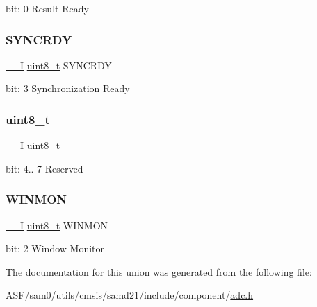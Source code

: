 bit\+: 0 Result Ready \mbox{\label{union_a_d_c___i_n_t_f_l_a_g___type_ae8a10cfa0bb63130ae1e8150943d680b}} 
\subsubsection{\texorpdfstring{SYNCRDY}{SYNCRDY}}
{\footnotesize\ttfamily \mbox{\hyperlink{core__cm0plus_8h_af63697ed9952cc71e1225efe205f6cd3}{\+\_\+\+\_\+I}} \mbox{\hyperlink{union_a_d_c___i_n_t_f_l_a_g___type_a5b4208c6f4c4a4290c4f2804d1eb1d5b}{uint8\+\_\+t}} S\+Y\+N\+C\+R\+DY}

bit\+: 3 Synchronization Ready \mbox{\label{union_a_d_c___i_n_t_f_l_a_g___type_a5b4208c6f4c4a4290c4f2804d1eb1d5b}} 
\subsubsection{\texorpdfstring{uint8\_t}{uint8\_t}}
{\footnotesize\ttfamily \mbox{\hyperlink{core__cm0plus_8h_af63697ed9952cc71e1225efe205f6cd3}{\+\_\+\+\_\+I}} uint8\+\_\+t}

bit\+: 4.. 7 Reserved \mbox{\label{union_a_d_c___i_n_t_f_l_a_g___type_abb342555b4de142cf8d3064427f4a1a9}} 
\subsubsection{\texorpdfstring{WINMON}{WINMON}}
{\footnotesize\ttfamily \mbox{\hyperlink{core__cm0plus_8h_af63697ed9952cc71e1225efe205f6cd3}{\+\_\+\+\_\+I}} \mbox{\hyperlink{union_a_d_c___i_n_t_f_l_a_g___type_a5b4208c6f4c4a4290c4f2804d1eb1d5b}{uint8\+\_\+t}} W\+I\+N\+M\+ON}

bit\+: 2 Window Monitor 

The documentation for this union was generated from the following file\+:\begin{DoxyCompactItemize}
\item 
A\+S\+F/sam0/utils/cmsis/samd21/include/component/\mbox{\hyperlink{component_2adc_8h}{adc.\+h}}\end{DoxyCompactItemize}
